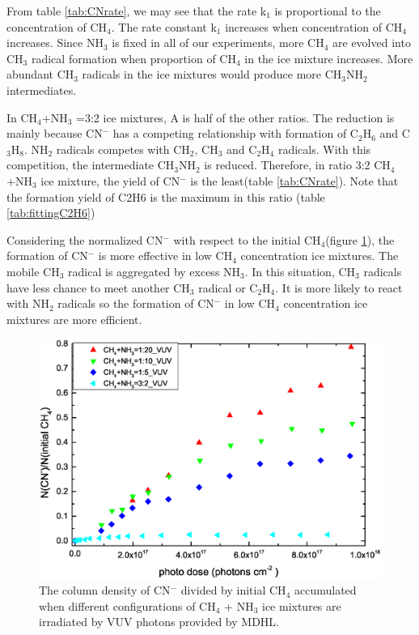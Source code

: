 From table \ref{tab:CNrate}, we may see that the rate k$_1$ is proportional to the concentration of CH$_4$. The rate constant k$_1$ increases when concentration of CH$_4$ increases. Since NH$_3$ is fixed in all of our experiments, more CH$_4$ are evolved into CH$_3$ radical formation when proportion of CH$_4$ in the ice mixture increases. More abundant CH$_3$ radicals in the ice mixtures would produce more CH$_3$NH$_2$ intermediates.

In CH$_4$+NH$_3$ =3:2 ice mixtures, A is half of the other ratios. The reduction is mainly because CN$^-$ has a competing relationship with formation of C$_2$H$_6$ and C$_3$H$_8$. NH$_2$ radicals competes with CH$_2$, CH$_3$ and C$_2$H$_4$ radicals. With this competition, the intermediate CH$_3$NH$_2$ is reduced. Therefore, in ratio 3:2 CH$_4$+NH$_3$ ice mixture, the yield of CN$^-$ is the least(table \ref{tab:CNrate}). Note that the formation yield of C2H6 is the maximum in this ratio (table \ref{tab:fittingC2H6})


Considering the normalized CN$^-$ with respect to the initial CH$_4$(figure \ref{fig:CN_CH4}), the formation of CN$^-$ is more effective in low CH$_4$ concentration ice mixtures. The mobile CH$_3$ radical is aggregated by excess NH$_3$. In this situation, CH$_3$ radicals have less chance to meet another CH$_3$ radical or C$_2$H$_4$. It is more likely to react with NH$_2$ radicals so the formation of CN$^-$ in low CH$_4$ concentration ice mixtures are more efficient.

\begin{figure}
\centering
\includegraphics[width=\textwidth]{figures/chapter3/CN_CH4.eps}
\caption{The column density of CN$^-$ divided by initial CH$_4$ accumulated when different configurations of CH$_4$ + NH$_3$ ice mixtures are irradiated by VUV photons provided by MDHL.}
\label{fig:CN_CH4}
\end{figure}

